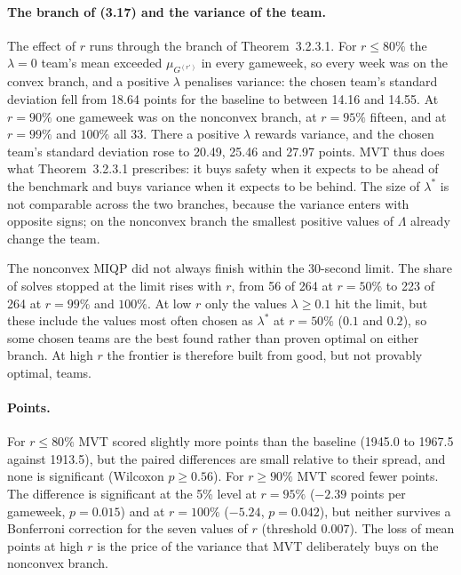 \paragraph{The branch of (3.17) and the variance of the team.} The effect of $r$ runs through
the branch of Theorem~3.2.3.1. For $r\le 80\%$ the $\lambda=0$ team's mean exceeded
$\mu_{G^{(r')}}$ in every gameweek, so every week was on the convex branch, and a positive
$\lambda$ penalises variance: the chosen team's standard deviation fell from 18.64 points for
the baseline to between 14.16 and 14.55. At $r=90\%$ one gameweek was on the nonconvex branch,
at $r=95\%$ fifteen, and at $r=99\%$ and $100\%$ all 33. There a positive $\lambda$ rewards
variance, and the chosen team's standard deviation rose to 20.49, 25.46 and 27.97 points.
MVT thus does what Theorem~3.2.3.1 prescribes: it buys safety when it expects to be ahead of the
benchmark and buys variance when it expects to be behind. The size of $\lambda^*$ is not
comparable across the two branches, because the variance enters with opposite signs; on the
nonconvex branch the smallest positive values of $\Lambda$ already change the team.

The nonconvex MIQP did not always finish within the 30-second limit. The share of solves
stopped at the limit rises with $r$, from 56 of 264 at $r=50\%$ to 223 of 264 at $r=99\%$ and
$100\%$. At low $r$ only the values $\lambda\ge 0.1$ hit the limit, but these include the
values most often chosen as $\lambda^*$ at $r=50\%$ ($0.1$ and $0.2$), so some chosen teams are
the best found rather than proven optimal on either branch.
At high $r$ the frontier is therefore built from good, but not provably optimal, teams.

\paragraph{Points.} For $r\le 80\%$ MVT scored slightly more points than the baseline (1945.0
to 1967.5 against 1913.5), but the paired differences are small relative to their spread, and
none is significant (Wilcoxon $p\ge 0.56$). For $r\ge 90\%$ MVT scored fewer points. The
difference is significant at the 5\% level at $r=95\%$ ($-2.39$ points per gameweek, $p=0.015$)
and at $r=100\%$ ($-5.24$, $p=0.042$), but neither survives a Bonferroni correction for the
seven values of $r$ (threshold $0.007$). The loss of mean points at high $r$ is the price of the
variance that MVT deliberately buys on the nonconvex branch.


